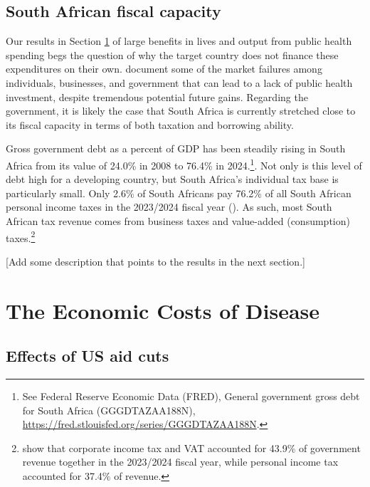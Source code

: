 \documentclass[letterpaper,12pt]{article}
\theoremstyle{definition}
\begin{document}
\begin{spacing}{1.5}


\subsection{South African fiscal capacity}

Our results in Section \ref{SecResults} of large benefits in lives and output from public health spending begs the question of why the target country does not finance these expenditures on their own. \citet{DeBackerEtAl:2025} document some of the market failures among individuals, businesses, and government that can lead to a lack of public health investment, despite tremendous potential future gains. Regarding the government, it is likely the case that South Africa is currently stretched close to its fiscal capacity in terms of both taxation and borrowing ability.

Gross government debt as a percent of GDP has been steadily rising in South Africa from its value of 24.0\% in 2008 to 76.4\% in 2024.\footnote{See Federal Reserve Economic Data (FRED), General government gross debt for South Africa (GGGDTAZAA188N), \href{https://fred.stlouisfed.org/series/GGGDTAZAA188N}{https://fred.stlouisfed.org/series/GGGDTAZAA188N}.}. Not only is this level of debt high for a developing country, but South Africa's individual tax base is particularly small. Only 2.6\% of South Africans pay 76.2\% of all South African personal income taxes in the 2023/2024 fiscal year (\citealp{DailyInvestor:2024}). As such, most South African tax revenue comes from business taxes and value-added (consumption) taxes.\footnote{\citet{KeiswetterPieterse:2024} show that corporate income tax and VAT accounted for 43.9\% of government revenue together in the 2023/2024 fiscal year, while personal income tax accounted for 37.4\% of revenue.}

[Add some description that points to the results in the next section.]


\section{The Economic Costs of Disease}\label{SecResults}

\subsection{Effects of US aid cuts}\label{SecResultsCuts}


\end{spacing}
\end{document}
